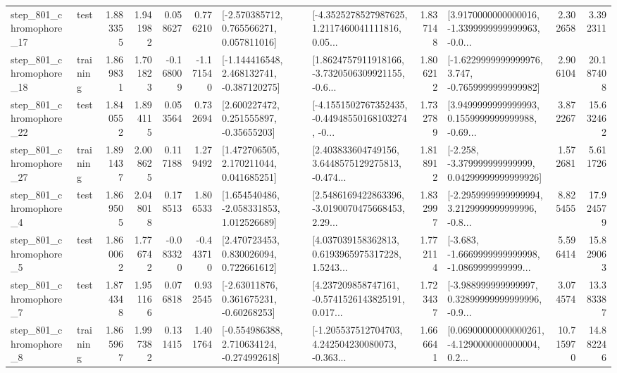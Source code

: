 \begin{tabular}{llrrrrllrlrr}
  step\_801\_chromophore\_17 &      test &      1.883355 &    1.941982 &      0.058627 &  0.776210 &    [-2.570385712, 0.765566271, 0.057811016] &  [-4.3525278527987625, 1.2117460041111816, 0.05... &       1.837148 &  [3.9170000000000016, -1.3399999999999963, -0.0... &            2.302658 &          3.392311 \\
  step\_801\_chromophore\_18 &  training &      1.869831 &    1.701823 &     -0.168009 & -1.171540 &   [-1.144416548, 2.468132741, -0.387120275] &  [1.8624757911918166, -3.7320506309921155, -0.6... &       1.806212 &  [-1.6229999999999976, 3.747, -0.7659999999999982] &            2.906104 &         20.187408 \\
  step\_801\_chromophore\_22 &      test &      1.840552 &    1.894115 &      0.053564 &  0.732694 &     [2.600227472, 0.251555897, -0.35655203] &  [-4.1551502767352435, -0.44948550168103274, -0... &       1.732789 &  [3.9499999999999993, 0.1559999999999988, -0.69... &            3.872267 &         15.632462 \\
  step\_801\_chromophore\_27 &  training &      1.891437 &    2.008625 &      0.117188 &  1.279492 &     [1.472706505, 2.170211044, 0.041685251] &  [2.403833604749156, 3.6448575129275813, -0.474... &       1.818912 &  [-2.258, -3.379999999999999, 0.04299999999999926] &            1.572681 &          5.611726 \\
   step\_801\_chromophore\_4 &      test &      1.869505 &    2.048018 &      0.178513 &  1.806533 &    [1.654540486, -2.058331853, 1.012526689] &  [2.5486169422863396, -3.0190070475668453, 2.29... &       1.832997 &  [-2.2959999999999994, 3.2129999999999996, -0.8... &            8.825455 &         17.924579 \\
   step\_801\_chromophore\_5 &      test &      1.860062 &    1.776742 &     -0.083320 & -0.443710 &     [2.470723453, 0.830026094, 0.722661612] &  [4.037039158362813, 0.6193965975317228, 1.5243... &       1.772114 &  [-3.683, -1.6669999999999998, -1.0869999999999... &            5.596414 &         15.829063 \\
   step\_801\_chromophore\_7 &      test &      1.874348 &    1.951166 &      0.076818 &  0.932545 &     [-2.63011876, 0.361675231, -0.60268253] &  [4.237209858747161, -0.5741526143825191, 0.017... &       1.723437 &  [-3.988999999999997, 0.32899999999999996, -0.9... &            3.074574 &         13.383387 \\
   step\_801\_chromophore\_8 &  training &      1.865967 &    1.997382 &      0.131415 &  1.401764 &   [-0.554986388, 2.710634124, -0.274992618] &  [-1.205537512704703, 4.242504230080073, -0.363... &       1.666641 &  [0.06900000000000261, -4.1290000000000004, 0.2... &           10.715970 &         14.882246 \\

\end{tabular}

